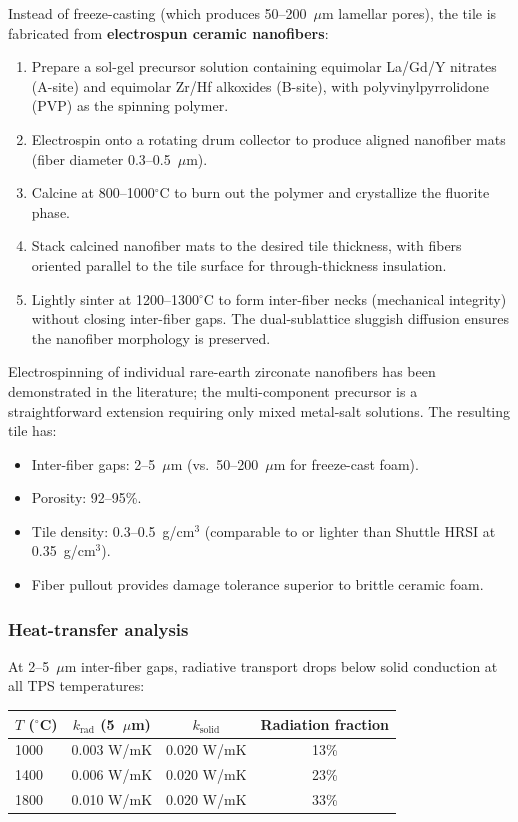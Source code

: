 \documentclass[12pt,letterpaper]{article}
\theoremstyle{definition}
\begin{document}
Instead of freeze-casting (which produces 50--200~$\mu$m lamellar pores), the tile is fabricated from \textbf{electrospun ceramic nanofibers}:

\begin{enumerate}
  \item Prepare a sol-gel precursor solution containing equimolar La/Gd/Y nitrates (A-site) and equimolar Zr/Hf alkoxides (B-site), with polyvinylpyrrolidone (PVP) as the spinning polymer.
  \item Electrospin onto a rotating drum collector to produce aligned nanofiber mats (fiber diameter 0.3--0.5~$\mu$m).
  \item Calcine at 800--1000$^\circ$C to burn out the polymer and crystallize the fluorite phase.
  \item Stack calcined nanofiber mats to the desired tile thickness, with fibers oriented parallel to the tile surface for through-thickness insulation.
  \item Lightly sinter at 1200--1300$^\circ$C to form inter-fiber necks (mechanical integrity) without closing inter-fiber gaps.  The dual-sublattice sluggish diffusion ensures the nanofiber morphology is preserved.
\end{enumerate}

Electrospinning of individual rare-earth zirconate nanofibers has been demonstrated in the literature; the multi-component precursor is a straightforward extension requiring only mixed metal-salt solutions.  The resulting tile has:
\begin{itemize}
  \item Inter-fiber gaps: 2--5~$\mu$m (vs.\ 50--200~$\mu$m for freeze-cast foam).
  \item Porosity: 92--95\%.
  \item Tile density: 0.3--0.5~g/cm$^3$ (comparable to or lighter than Shuttle HRSI at 0.35~g/cm$^3$).
  \item Fiber pullout provides damage tolerance superior to brittle ceramic foam.
\end{itemize}

\subsubsection{Heat-transfer analysis}

At 2--5~$\mu$m inter-fiber gaps, radiative transport drops below solid conduction at all TPS temperatures:

\begin{center}
\begin{tabular}{@{}lccc@{}}
\toprule
$T$ ($^\circ$C) & $k_{\mathrm{rad}}$ (5~$\mu$m) & $k_{\mathrm{solid}}$ & Radiation fraction \\
\midrule
1000 & 0.003 W/mK & 0.020 W/mK & 13\% \\
1400 & 0.006 W/mK & 0.020 W/mK & 23\% \\
1800 & 0.010 W/mK & 0.020 W/mK & 33\% \\
\bottomrule
\end{tabular}
\end{center}
\end{document}
